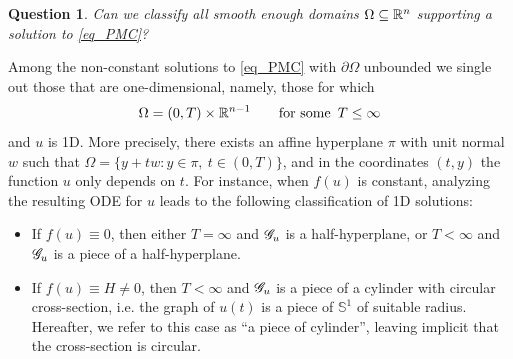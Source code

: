 \documentclass[10 pt,a4paper]{article}
\newtheorem{question}{Question}
\theoremstyle{definition}
\begin{document}
\begin{question}\label{Q1}
	Can we classify all smooth enough domains $\Omega \subseteq \mathbb R^n$ supporting a solution to \eqref{eq_PMC}? 
\end{question}
 
Among the non-constant solutions to \eqref{eq_PMC} with  $\partial \Omega$ unbounded we single out those that are one-dimensional, namely, those for which 
\[
	\Omega = (0,T) \times \mathbb R^{n-1} \qquad \text{for some } \, T \le \infty 
\]
and $u$ is 1D. More precisely, there exists an affine hyperplane $\pi$ with unit normal $w$ such that $\Omega = \{ y + tw : y \in \pi, \ t \in (0,T)\}$, and in the coordinates $(t,y)$ the function $u$ only depends on $t$. For instance, when  $f(u)$ is constant, analyzing the resulting ODE for $u$ leads to the following classification of 1D solutions:



\begin{itemize}
	\item If $f(u) \equiv 0$, then either $T = \infty$ and $\mathscr{G}_u$ is a half-hyperplane, or $T< \infty$ and $\mathscr{G}_u$ is a piece of a half-hyperplane.
	\item If $f(u) \equiv H \neq 0$, then $T< \infty$ and $\mathscr{G}_u$ is a piece of a cylinder with circular cross-section, i.e. the graph of $u(t)$ is a piece of $\mathbb{S}^1$ of suitable radius. Hereafter, we refer to this case as ``a piece of cylinder'', leaving implicit that the cross-section is circular. 	 
\end{itemize}
\end{document}
